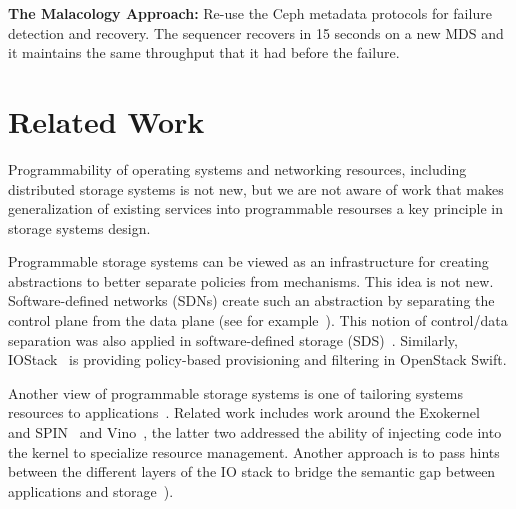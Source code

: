 \documentclass[preprint]{sigplanconf-eurosys}
\begin{document}
\textbf{The Malacology Approach:} Re-use the Ceph metadata protocols for
failure detection and recovery. The sequencer recovers in 15 seconds on a new
MDS and it maintains the same throughput that it had before the failure.

%
%
%

\section{Related Work}


Programmability of operating systems and networking resources, including
distributed storage systems is not new, but we are not aware of work that makes
generalization of existing services into programmable resourses a key principle
in storage systems design. 

Programmable storage systems can be viewed as an infrastructure for creating
abstractions to better separate policies from mechanisms. This idea is not new.
Software-defined networks (SDNs) create such an abstraction by separating the
control plane from the data plane (see for example~\cite{jain:sigcomm13}). This
notion of control/data separation was also applied in software-defined storage
(SDS)~\cite{arpaci:sosp01,thereska:sosp13,stefanovici:fast16}. Similarly,
IOStack~\cite{gracia:internet16} is providing policy-based provisioning and
filtering in OpenStack Swift. 

Another view of programmable storage systems is one of tailoring systems
resources to applications~\cite{arpaci:sosp01}. Related work includes work
around the Exokernel~\cite{engler:sosp95} and SPIN~\cite{bershad:sosp95} and
Vino~\cite{seltzer:osdi96}, the latter two addressed the ability of injecting
code into the kernel to specialize resource management. Another approach is to
pass hints between the different layers of the IO stack to bridge the semantic
gap between applications and
storage~\cite{arpaci:sosp01,sivathanu:fast03,mesnier:sosp11}).
\end{document}
